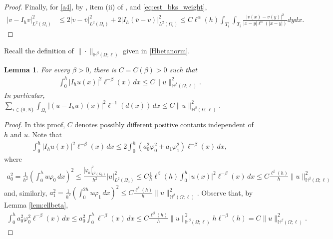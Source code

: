 \documentclass[11 pt]{article}
\newtheorem{lemma}[theorem]{Lemma}
\numberwithin{equation}{section}
\begin{document}
\begin{proof}
Finally, for \eqref{a4}, by , item (ii) of , and \eqref{eq:est_bks_weight}, 
\begin{align*}
    |v-I_h v|_{L^2(\Omega_i)}^2&\leq 2|v-\overline{v}|_{L^2(\Omega_i)}^2+2|I_h(\overline{v}-v)|_{L^2(\Omega_i)}^2\leq C\ell^{\alpha}(h)\int_{T_{i}}\int_{T_{i}}\frac{|v(x)-v(y)|^2}{|x-y|\ell^{\alpha}(|x-y|)}dy dx.
\end{align*}
\end{proof}

Recall the definition of $\|\cdot\|_{\mathbb H^{\beta}(\Omega;\ell)}$ given in \eqref{Hbetanorm}.
\begin{lemma}
For every $\beta>0$, there is $C=C(\beta)>0$ such that
\begin{align*}
 \int_{0}^h |I_h u(x)|^2 \ell^{-\beta}(x)\, dx\leq C\|u\|^2_{\mathbb H^{\beta}(\Omega;\ell)}.
\end{align*}
In particular, $\sum_{i\in\{0,N\}}\int_{\Omega_i}|(u-I_h u)(x)|^2\ell^{-1}(d(x))\,dx\leq C\|u\|^2_{\mathbb H^{\beta}(\Omega;\ell)}.$
\end{lemma}
\begin{proof}
In this proof, $C$ denotes possibly different positive contants independent of $h$ and $u$. Note that
\begin{align*}
 \int_{0}^h |I_h u(x)|^2 \ell^{-\beta}(x)\, dx
 \leq 2\int_{0}^h (a_0^2\varphi_0^2+a_1\varphi_1^2) \ell^{-\beta}(x)\, dx,
\end{align*}
where
\begin{align*}
 a_0^2
 =\frac{1}{h^2}\left(\int_0^h u\varphi_0\, dx \right)^2
 \leq\frac{|\varphi_0|^2_{L^2(\Omega_0)}}{h^2}|u|^2_{L^2(\Omega_0)}
 \leq C\frac{1}{h}\ell^\beta(h)\int_0^h|u(x)|^2\ell^{-\beta}(x)\, dx
 \leq C\frac{\ell^\beta(h)}{h}\|u\|^2_{\mathbb H^{\beta}(\Omega;\ell)}
\end{align*}
and, similarly, $a_1^2=\frac{1}{h^2}\left(\int_0^{2h} u\varphi_1\, dx \right)^2\leq C\frac{\ell^\beta(h)}{h}\|u\|^2_{\mathbb H^{\beta}(\Omega;\ell)}$. Observe that, by Lemma \ref{lem:ellbeta},
\begin{align*}
 \int_{0}^h a_0^2\varphi_0^2\ell^{-\beta}(x)\, dx
 \leq a_0^2\int_{0}^h \ell^{-\beta}(x)\, dx
 \leq C\frac{\ell^\beta(h)}{h}\|u\|^2_{\mathbb H^{\beta}(\Omega;\ell)} h \ell^{-\beta}(h)=C\|u\|^2_{\mathbb H^{\beta}(\Omega;\ell)}.
\end{align*}

\end{proof}
\end{document}
